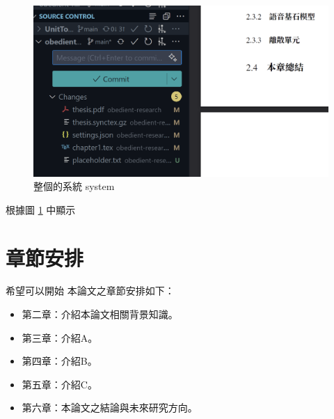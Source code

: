 \begin{figure}[hbt!]
    \centering
    \includegraphics{figures/figfake1.png}
    \caption{整個的系統 system}
    \label{fig:mysts}
\end{figure}

根據圖 \ref{fig:mysts} 中顯示



\section{章節安排}
希望可以開始
本論文之章節安排如下：

\begin{itemize}
  \itemsep -2pt %
  \item  第二章：介紹本論文相關背景知識。
  \item  第三章：介紹A。
  \item  第四章：介紹B。
  \item  第五章：介紹C。
  \item  第六章：本論文之結論與未來研究方向。
\end{itemize}




